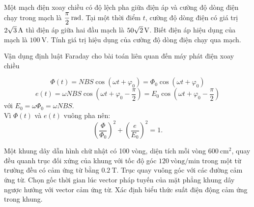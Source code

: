 \begin{vd}
Một mạch điện xoay chiều có độ lệch pha giữa điện áp và cường độ dòng điện chạy trong mạch là $\xsi{\dfrac{\pi}{2}}{\radian}$. Tại một thời điểm $t$, cường độ dòng điện có giá trị $\xsi{2\sqrt{3}}{\ampere}$ thì điện áp giữa hai đầu mạch là $\xsi{50\sqrt{2}}{\volt}$. Biết điện áp  hiệu dụng của mạch là $\SI{100}{\volt}$. Tính giá trị hiệu dụng của cường độ dòng điện chạy qua mạch.
\end{vd}
\begin{dang}{Vận dụng định luật Faraday cho bài toán liên quan đến máy phát điện xoay chiều}

		$$\Phi\left(t\right)=NBS\cos\left(\omega t+\varphi_0\right)=\Phi_0\cos\left(\omega t+\varphi_0\right)$$
		$$e\left(t\right)=\omega NBS\cos\left(\omega t+\varphi_0-\dfrac{\pi}{2}\right)=E_0\cos\left(\omega t+\varphi_0-\dfrac{\pi}{2}\right)$$
		với $E_0=\omega \Phi_0=\omega NBS.$\\
		Vì $\Phi\left(t\right)$ và $e\left(t\right)$ vuông pha nên:
		$$\left(\dfrac{\Phi}{\Phi_0}\right)^2+\left(\dfrac{e}{E_0}\right)^2=1.$$
	\end{dang}
\begin{vd}
	Một khung dây dẫn hình chữ nhật có 100 vòng, diện tích mỗi vòng $\SI{600}{\centi\meter^2}$, quay đều quanh trục đối xứng của khung với tốc độ góc $\SI{120}{\text{vòng}/\minute}$ trong một từ trường đều có cảm ứng từ bằng $\SI{0.2}{\tesla}$. Trục quay vuông góc với các đường cảm ứng từ. Chọn gốc thời gian lúc vector pháp tuyến của mặt phẳng khung dây ngược hướng với vector cảm ứng từ. Xác định biểu thức suất điện động cảm ứng trong khung.
\end{vd}
